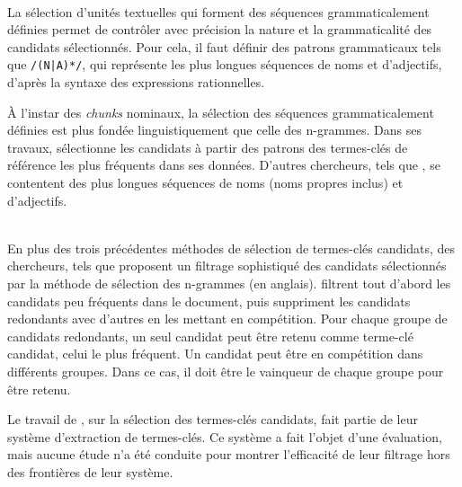     \begin{example}
    \end{example}

    ~\\La sélection d'unités textuelles qui forment des séquences
    grammaticalement définies permet de contrôler
    avec précision la nature et la grammaticalité des candidats sélectionnés.
    Pour cela, il faut définir des patrons grammaticaux tels que \texttt{/(N|A)*/}, qui représente les plus longues séquences de noms et
    d'adjectifs, d'après la syntaxe des expressions rationnelles.

    À l'instar des \textit{chunks} nominaux, la sélection des séquences
    grammaticalement définies est plus fondée linguistiquement que celle des
    n-grammes. Dans ses travaux, 
    sélectionne les candidats à partir des patrons des termes-clés de référence
    les plus fréquents dans ses données. D'autres chercheurs,
    tels que , se contentent des plus longues
    séquences de noms (noms propres inclus) et d'adjectifs.

    \begin{example}
    \end{example}

    ~\\En plus des trois précédentes méthodes de sélection de termes-clés
    candidats, des chercheurs, tels que
     proposent un filtrage
    sophistiqué des candidats sélectionnés par la méthode de sélection des
    n-grammes (en anglais). 
    filtrent tout d'abord les candidats peu fréquents dans le document, puis
    suppriment les candidats redondants avec d'autres en les mettant en
    compétition. Pour chaque groupe de candidats redondants, un seul candidat
    peut être retenu comme terme-clé candidat, celui le plus fréquent. Un
    candidat peut être en compétition dans différents groupes. Dans ce cas, il
    doit être le \og{}vainqueur\fg{} de chaque groupe pour être retenu.

    Le travail de , sur la
    sélection des termes-clés candidats, fait partie de leur système
    d'extraction de termes-clés. Ce système a fait l'objet d'une évaluation,
    mais aucune étude n'a été conduite pour montrer l'efficacité de leur
    filtrage hors des frontières de leur système.

